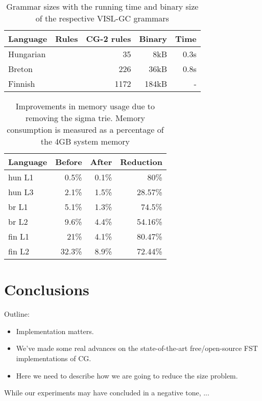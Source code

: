 \documentclass{article}
\begin{document}
\begin{table*}[h]
  \centering
  \caption{Grammar sizes with the running time and binary size of the respective
           VISL-GC grammars}
  \label{tab:grammar_size}
  \begin{tabular}{ | l | r | r | r | r | }
  \hline
  \textbf{Language} & \textbf{Rules} & \textbf{CG-2 rules} &
  \textbf{Binary} & \textbf{Time} \\
  \hline
  Hungarian & &   35 &   8kB & 0.3s \\
  Breton    & &  226 &  36kB & 0.8s \\
  Finnish   & & 1172 & 184kB & - \\    %
  \hline
  \end{tabular}
\end{table*}

\begin{table}[h]
  \centering
  \caption{Improvements in memory usage due to removing the sigma trie. Memory
           consumption is measured as a percentage of the 4GB system memory}
  \label{tab:sigma_memory}
  \begin{tabular}{ | l | r | r | r | }
  \hline
  \textbf{Language} & \textbf{Before} & \textbf{After} & \textbf{Reduction} \\
  \hline
  hun L1 & 0.5\% & 0.1\% & 80\% \\
  hun L3 & 2.1\% & 1.5\% & 28.57\% \\
  br L1 & 5.1\% & 1.3\% & 74.5\% \\
  br L2 & 9.6\% & 4.4\% & 54.16\% \\
  fin L1 & 21\% & 4.1\% & 80.47\% \\
  fin L2 & 32.3\% & 8.9\% & 72.44\% \\
  \hline
  \end{tabular}
\end{table}

\section{Conclusions}
\label{sec:conclusion}
Outline:
\begin{itemize}
\item Implementation matters.
\item We've made some real advances on the state-of-the-art free/open-source
  FST implementations of CG. 
\item Here we need to describe how we are going to reduce the size problem.
\end{itemize}
While our experiments may have concluded in a negative tone, ...
\end{document}
